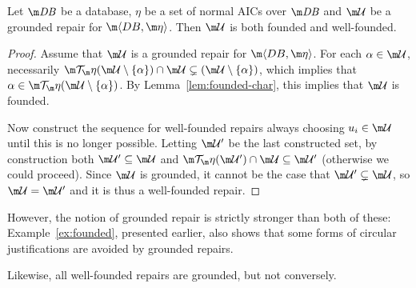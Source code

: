 \begin{lemma}
  \label{lem:founded}
  Let $\db$ be a database, $\eta$ be a set of normal AICs over $\db$ and $\UU$ be a grounded repair for $\fulldb$.
  Then $\UU$ is both founded and well-founded.
\end{lemma}
\begin{proof}
  Assume that $\UU$ is a grounded repair for $\fulldb$.
  For each $\alpha\in\UU$, necessarily $\Op(\UU\setminus\{\alpha\})\cap\UU\subsetneq(\UU\setminus\{\alpha\})$, which implies that $\alpha\in\Op(\UU\setminus\{\alpha\})$.
  By Lemma~\ref{lem:founded-char}, this implies that $\UU$ is founded.

  Now construct the sequence for well-founded repairs always choosing $u_i\in\UU$ until this is no longer possible.
  Letting $\UU'$ be the last constructed set, by construction both $\UU'\subseteq\UU$ and $\Op(\UU')\cap\UU\subseteq\UU'$ (otherwise we could proceed).
  Since $\UU$ is grounded, it cannot be the case that $\UU'\subsetneq\UU$, so $\UU=\UU'$ and it is thus a well-founded repair.
\end{proof}

However, the notion of grounded repair is strictly stronger than both of these: Example~\ref{ex:founded}, presented earlier, also shows that some forms of circular justifications are avoided by grounded repairs.

Likewise, all well-founded repairs are grounded, but not conversely.

